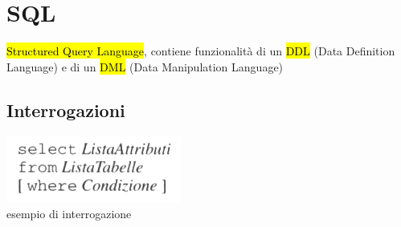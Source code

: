 \documentclass[a4paper]{article}
\begin{document}
\section{SQL}
\hl{Structured Query Language}, contiene funzionalità di un \hl{DDL} (Data Definition Language) e di un \hl{DML} (Data Manipulation Language)\medskip\\

\subsection{Interrogazioni}
\begin{center}
      \includegraphics[scale=0.5]{img/sql1.png}\\
      esempio di interrogazione
\end{center}
\end{document}
